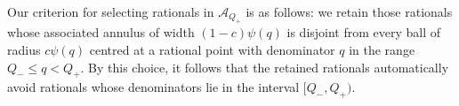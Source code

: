 \documentclass[11pt]{amsart}
\numberwithin{equation}{section}
\newcommand{\0}{\mathbf{0}}
\theoremstyle{remark}
\begin{document}
{%
Our criterion for selecting rationals in $\mathcal{A}_{Q_+}$ is as follows: we retain those rationals whose associated annulus of width $(1-c)\psi(q)$ is disjoint from every ball of radius $c\psi(q)$ centred at a rational point with denominator $q$ in the range $Q_-\le q< Q_+$. By this choice, it follows that the retained rationals automatically avoid rationals whose denominators lie in the interval $[Q_-,Q_+)$.

}
\end{document}

